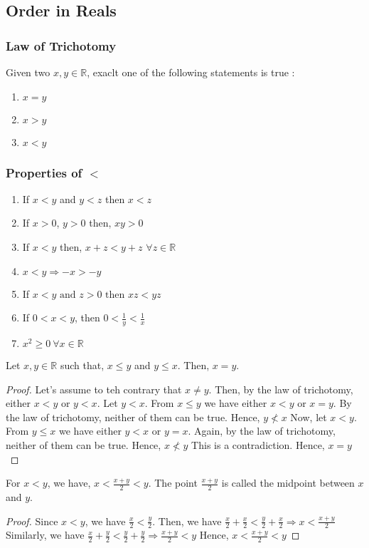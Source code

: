\documentclass{scrartcl}
\newcommand{\rn}{\mathbb{R}}
\begin{document}
    \subsection{Order in Reals}
    \subsubsection{Law of Trichotomy}
    Given two $x, y \in \rn$, exaclt one of the following statements is true :
    \begin{enumerate}[label={(\roman*)}]
        \item $x = y$
        \item $x > y$
        \item $x < y$
    \end{enumerate}
    \subsubsection{Properties of $<$}
    \begin{enumerate}[label={(\roman*)}]
        \item If $x < y$ and $y < z$ then $x < z$
        \item If $x > 0$, $y>0$ then, $xy >0$
        \item If $x < y$ then, $x + z < y +z$ $\forall z \in \rn$
        \item $x < y \Rightarrow -x > -y$
        \item If $x < y \text{ and } z > 0 \text{ then } xz < yz$
        \item If $0<x<y$, then $0<\frac{1}{y}<\frac{1}{x}$
        \item $x^2 \geq 0 ~ \forall x \in \rn$
    \end{enumerate}
    \begin{remark}
        Let $x, y \in \rn$ such that, $x \leq y$ and $y \leq x$. Then, $x=y$. 
        \begin{proof}
            Let's assume to teh contrary that $x \neq y$. Then, by the law of trichotomy, either $x < y$ or $y < x$.
            Let $y < x$. From $x \leq y$ we have either $x < y$ or $x = y$. By the law of trichotomy, neither of them can be true. Hence, $y \nless x$
            Now, let $x < y$. From $y \leq x$ we have either $y < x$ or $y = x$. Again, by the law of trichotomy, neither of them can be true. Hence, $x \nless y$
            This is a contradiction. Hence, $x = y$
        \end{proof}
    \end{remark}
	\begin{example}
        For $x<y$, we have, $x<\frac{x+y}{2}<y$. The point $\frac{x + y}{2}$ is called the midpoint between $x$ and $y$.
        \begin{proof}
            Since $x < y$, we have $\frac{x}{2} < \frac{y}{2}$. Then, we have $\frac{x}{2} + \frac{x}{2} < \frac{y}{2} + \frac{x}{2} \Rightarrow x < \frac{x + y}{2}$
		    Similarly, we have $\frac{x}{2} + \frac{y}{2} < \frac{y}{2} + \frac{y}{2}\Rightarrow \frac{x + y}{2} < y$
            Hence, $x < \frac{x + y}{2} < y$
        \end{proof}
	\end{example}
\end{document}
